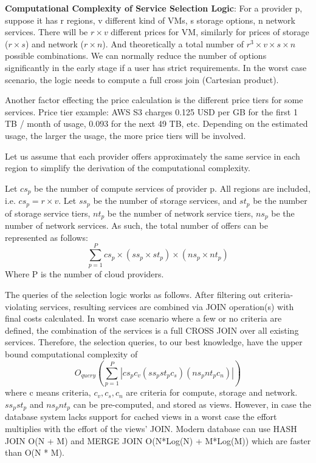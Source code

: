 \textbf{Computational Complexity of Service Selection Logic}:
For a provider p, suppose it has r regions, v different kind of VMs,
s storage options, n network services.
There will be $r \times v$ different prices for VM, similarly for prices of storage ($r \times s$)
and network ($r \times n$).
And theoretically a total number of $r^{3} \times v \times s \times n$ possible combinations.
We can normally reduce the number of
options significantly in the early stage if a user has strict requirements. In the worst
case scenario, the logic needs to compute a full cross join (Cartesian product).

Another factor effecting the price calculation is the different price tiers for some services. 
Price tier example: AWS S3 charges 0.125 USD per GB for the first 1 TB /
month of usage, 0.093 for the next 49 TB, etc.
Depending on the estimated usage,
the larger the usage, the more price tiers will be involved.

Let us assume that each
provider offers approximately the same service in each region to simplify the
derivation of the computational complexity.

Let $cs_{p}$ be the number of compute services of provider p.
All regions are included, i.e. $cs_{p} = r \times v$.
Let $ss_{p}$ be the number of storage services, and $st_{p}$ be the number of storage service tiers,
$nt_{p}$ be the number of network service tiers,
$ns_{p}$ be the number of network services.
As such, the total number of offers can be
represented as follows:
$$
\sum_{p=1}^{P} cs_{p} \times (ss_{p} \times st_{p}) \times (ns_{p} \times nt_{p})
$$
Where P is the number of cloud providers.

The queries of the selection logic works as follows. After filtering out criteria-violating
services, resulting services are combined via JOIN operation(s) with final
costs calculated. In worst case scenario where a few or no criteria are defined, the
combination of the services is a full CROSS JOIN over all existing services.
Therefore, the selection queries, to our best knowledge,
have the upper bound computational complexity of
$$
O_{query}(\sum_{p=1}^{P}|cs_{p} c_{v} (ss_{p} st_{p} c_{s}) (ns_{p} nt_{p} c_{n}) | )
$$
where c means criteria, $c_{v}, c_{s}, c_{n}$ are criteria for compute, storage and network.
$ss_{p} st_{p}$ and $ns_{p} nt_{p}$ can be pre-computed, and stored as views.
However, in case the database system lacks
support for cached views in a worst case the effort multiplies with the effort of the
views’ JOIN. Modern database can use HASH JOIN O(N + M) and MERGE JOIN
O(N*Log(N) + M*Log(M)) which are faster than O(N * M).

